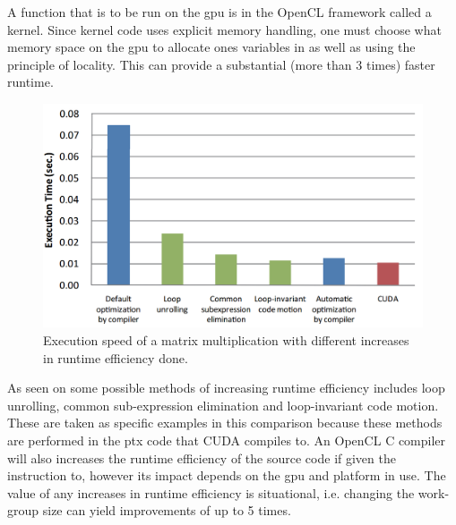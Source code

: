 A function that is to be run on the \acrshort{gpu} is in the OpenCL framework called a kernel.
Since kernel code uses explicit memory handling, one must choose what memory space on the \acrshort{gpu} to allocate ones variables in as well as using the principle of locality.
This can provide a substantial (more than 3 times) faster runtime. \citep{ocl_lecture3}
\begin{figure}[h]
\centering	
 \includegraphics[width=1\textwidth]{figures/opencloptimisation.png} %
\caption{Execution speed of a matrix multiplication with different increases in runtime efficiency done.  \citep{CUDAOpenCLOptimisation}}\label{image:OpenCLOptCompare}
\vspace{-15pt}
\end{figure}
As seen on  some possible methods of increasing runtime efficiency includes loop unrolling, common sub-expression elimination and loop-invariant code motion. 
These are taken as specific examples in this comparison because these methods are performed in the \acrfull{ptx} code that CUDA compiles to. %
An OpenCL C compiler will also increases the runtime efficiency of the source code if given the instruction to, however its impact depends on the \acrshort{gpu} and platform in use.
The value of any increases in runtime efficiency is situational, i.e. changing the work-group size can yield improvements of up to 5 times. \citep{ocl_lecture3}
